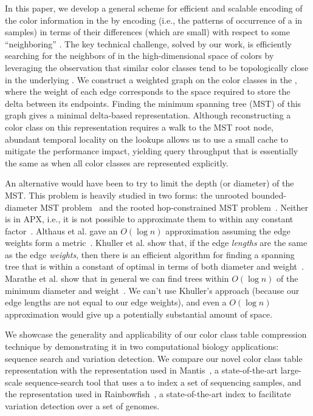 In this paper, we develop a general scheme for efficient and scalable encoding
of the color information in the \cdbg by encoding \ccs (i.e., the patterns of
occurrence of a \kmer in samples) in terms of their differences (which are
small) with respect to some ``neighboring'' \cc.  The key technical
challenge, solved by our work, is efficiently searching for the neighbors of
\ccs in the high-dimensional space of colors by leveraging the observation that
similar color classes tend to be topologically close in the underlying \dbg.  We
construct a weighted graph on the color classes in the \cdbg, where the weight
of each edge corresponds to the space required to store the delta between its
endpoints.  Finding the minimum spanning tree (MST) of this graph gives a
minimal delta-based representation.
Although reconstructing a color class on this representation requires
a walk to the MST root node, abundant temporal locality on the lookups
allows us to use a small cache to mitigate the performance impact,
yielding query throughput that is essentially the same as when all
color classes are represented explicitly.

An alternative would have been to try to limit the depth (or diameter)
of the MST.  This problem is heavily studied in two forms: the
unrooted bounded-diameter MST problem~\cite{Raidl08} and the rooted
hop-constrained MST problem~\cite{AlthausFuHa05}.  Neither is in APX,
i.e., it is not possible to approximate them to within any constant
factor~\cite{ManyemStMa96}.  Althaus et al. gave an $O(\log n)$
approximation assuming the edge weights form a
metric~\cite{AlthausFuHa05}.  Khuller et al. show that, if the edge
\textit{lengths} are the same as the edge \textit{weights}, then there
is an efficient algorithm for finding a spanning tree that is within a
constant of optimal in terms of both diameter and
weight~\cite{KhullerBaNe02}.  Marathe et al. show that in general we
can find trees within $O(\log n)$ of the minimum diameter and
weight~\cite{MaratheRaSu98}.  We can't use Khuller's approach (because our edge
lengths are not equal to our edge weights), and even a $O(\log n)$
approximation would give up a potentially substantial amount of space.


We showcase the generality and applicability of our color class table
compression technique by demonstrating it in two computational biology
applications: sequence search and variation detection.
%
We compare our novel color class table representation with the representation
used in Mantis~\cite{mantis}, a state-of-the-art large-scale sequence-search
tool that uses a \cdbg to index a set of sequencing samples, and the representation used in
Rainbowfish~\citep{rainbowfish}, a state-of-the-art index to
facilitate variation detection over a set of genomes.

